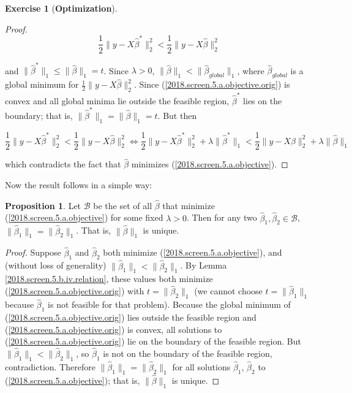 \documentclass{article}
\theoremstyle{definition}
\newtheorem{exercise}{Exercise}
\theoremstyle{definition}
\theoremstyle{definition}
\theoremstyle{definition}
\theoremstyle{definition}
\newtheorem{proposition}[theorem]{Proposition}
\begin{document}
\begin{exercise}[\textbf{Optimization}]
\begin{enumerate}[(a)]
\begin{enumerate}[(i)]
\begin{proof}
\[
\frac{1}{2} \lVert y - X \hat{\beta}^* \rVert_2^2  < \frac{1}{2} \lVert y - X \hat{\beta} \rVert_2^2
\]

and \(\lVert\hat{\beta}^*\rVert_1 \leq \lVert\hat{\beta}\rVert_1 = t\). Since \(\lambda > 0\), \(\lVert\hat{\beta}\rVert_1 < \lVert \hat{\beta}_{global} \rVert_1\), where \(\hat{\beta}_{global}\) is a global minimum for \(\frac{1}{2} \lVert y - X \hat{\beta} \rVert_2^2\). Since (\ref{2018.screen.5.a.objective.orig}) is convex and all global minima lie outside the feasible region, \(\hat{\beta}^*\) lies on the boundary; that is, \(\lVert \hat{\beta}^* \rVert_1 = \lVert\hat{\beta}\rVert_1 = t\). But then

\[
\frac{1}{2} \lVert y - X \hat{\beta}^* \rVert_2^2  < \frac{1}{2} \lVert y - X \hat{\beta} \rVert_2^2 \iff \frac{1}{2} \lVert y - X \hat{\beta}^* \rVert_2^2 + \lambda \lVert\hat{\beta}^* \rVert_1 < \frac{1}{2} \lVert y - X \hat{\beta} \rVert_2^2 +  \lambda \lVert\hat{\beta} \rVert_1
\]

which contradicts the fact that \(\hat{\beta}\) minimizes (\ref{2018.screen.5.a.objective}). 

\end{proof}

Now the result follows in a simple way:

\begin{proposition}
Let \(\mathcal{B}\) be the set of all \(\hat{\beta}\) that minimize (\ref{2018.screen.5.a.objective}) for some fixed \(\lambda > 0\). Then for any two \(\hat{\beta}_1, \hat{\beta}_2 \in \mathcal{B}\), \(\lVert \hat{\beta}_1 \rVert_1 = \lVert \hat{\beta}_2 \rVert_1\). That is, \(\lVert \hat{\beta} \rVert_1\) is unique.
\end{proposition}

\begin{proof}
Suppose \(\hat{\beta}_1\) and \(\hat{\beta}_2\) both minimize (\ref{2018.screen.5.a.objective}), and (without loss of generality) \(\lVert \hat{\beta}_1 \rVert_1 < \lVert \hat{\beta}_2 \rVert_1\). By Lemma \ref{2018.screen.5.b.iv.relation}, these values both minimize (\ref{2018.screen.5.a.objective.orig}) with \(t =  \lVert \hat{\beta}_2 \rVert_1\) (we cannot choose \(t =  \lVert \hat{\beta}_1 \rVert_1\) because \(\hat{\beta}_1\) is not feasible for that problem). Because the global minimum of (\ref{2018.screen.5.a.objective.orig}) lies outside the feasible region and  (\ref{2018.screen.5.a.objective.orig}) is convex, all solutions to (\ref{2018.screen.5.a.objective.orig}) lie on the boundary of the feasible region. But \(\lVert\hat{\beta}_1 \rVert_1 < \lVert \hat{\beta}_2 \rVert_1\), so \(\hat{\beta}_1\) is not on the boundary of the feasible region, contradiction. Therefore \(\lVert \hat{\beta}_1 \rVert_1 = \lVert \hat{\beta}_2 \rVert_1\) for all solutions \(\hat{\beta}_1\), \(\hat{\beta}_2\) to (\ref{2018.screen.5.a.objective}); that is,  \(\lVert \hat{\beta} \rVert_1\) is unique.
\end{proof}


\end{enumerate}
\end{enumerate}
\end{exercise}
\end{document}
